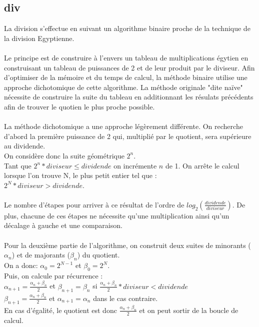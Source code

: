 \documentclass{article}
\begin{document}
\subsection{div}
La division s'effectue en suivant un algorithme binaire proche de la technique de la division Egyptienne.
\\
\\
Le principe est de construire à l'envers un tableau de multiplications égytien en construisant un tableau de puissances de 2 et de leur produit par le diviseur. Afin d'optimiser de la mémoire et du temps de calcul, la méthode binaire utilise une approche dichotomique de cette algorithme. La méthode originale "dite naïve" nécessite de construire la suite du tableau en additionnant les résulats précédents afin de trouver le quotien le plus
proche possible.
\\
\\
La méthode dichotomique a une approche légèrement différente. On recherche d'abord la première puissance de 2 qui, multiplié par le quotient, sera supérieure au dividende.
\\
On considère donc la suite géométrique $2^{n}$.
\\
Tant que $2^{n} * diviseur \leq dividende$ on incrémente $n$ de 1. On arrête le calcul lorsque l'on trouve N, le plus petit entier tel que :
\\
$2^{N} * diviseur > dividende$.
\\
\\
Le nombre d'étapes pour arriver à ce résultat de l'ordre de $log_{2}(\frac{dividende}{diviseur})$. De plus, chacune de ces étapes ne nécessite qu'une multiplication ainsi qu'un décalage à gauche et une comparaison.
\\
\\
Pour la deuxième partie de l'algorithme, on construit deux suites de minorants ($\alpha_{n}$) et de majorants ($\beta_{n}$) du quotient.
\\
On a donc: $\alpha_{0} = 2^{N-1}$ et $\beta_{0} = 2^{N}$.
\\
Puis, on calcule par récurrence :
\\
$\alpha_{n+1} = \frac{\alpha_{n} + \beta_{n}}{2}$ et $\beta_{n+1} = \beta_{n}$ si $\frac{\alpha_{n} + \beta_{n}}{2} * diviseur < dividende$
\\
$\beta_{n+1} = \frac{\alpha_{n} + \beta_{n}}{2}$ et $\alpha_{n+1} = \alpha_{n}$ dans le cas contraire.
\\
En cas d'égalité, le quotient est donc $\frac{\alpha_{n} + \beta_{n}}{2}$ et on peut sortir de la boucle de calcul.
\end{document}
